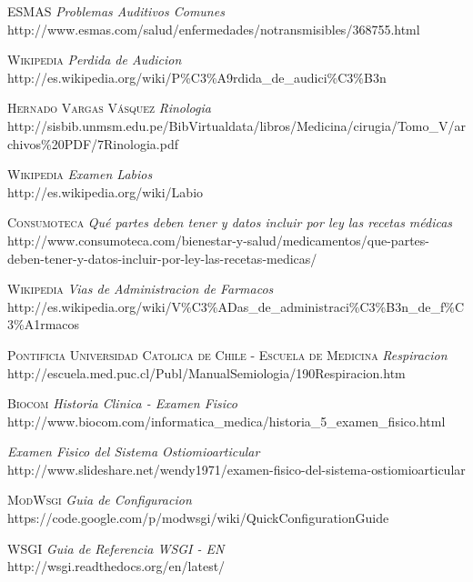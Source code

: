 \begin{thebibliography}{X}
     \textsc{ESMAS} \textit{Problemas Auditivos Comunes}  \\
        http://www.esmas.com/salud/enfermedades/notransmisibles/368755.html
    
     \textsc{Wikipedia} \textit{Perdida de Audicion}  \\
        http://es.wikipedia.org/wiki/P\%C3\%A9rdida\_de\_audici\%C3\%B3n

     \textsc{Hernado Vargas Vásquez} \textit{Rinologia}  \\
        http://sisbib.unmsm.edu.pe/BibVirtualdata/libros/Medicina/cirugia/Tomo\_V/archivos\%20PDF/7Rinologia.pdf
    
     \textsc{Wikipedia} \textit{Examen Labios}   \\
        http://es.wikipedia.org/wiki/Labio

     \textsc{Consumoteca} \textit{Qué partes deben tener y datos incluir por ley las recetas médicas} \\
        http://www.consumoteca.com/bienestar-y-salud/medicamentos/que-partes-deben-tener-y-datos-incluir-por-ley-las-recetas-medicas/

     \textsc{Wikipedia} \textit{Vias de Administracion de Farmacos}  \\
        http://es.wikipedia.org/wiki/V\%C3\%ADas\_de\_administraci\%C3\%B3n\_de\_f\%C3\%A1rmacos
    
     \textsc{Pontificia Universidad Catolica de Chile - Escuela de Medicina} \textit{Respiracion} \\
        http://escuela.med.puc.cl/Publ/ManualSemiologia/190Respiracion.htm

     \textsc{Biocom} \textit{Historia Clinica - Examen Fisico}  \\
        http://www.biocom.com/informatica\_medica/historia\_5\_examen\_fisico.html

     \textit{Examen Fisico del Sistema Ostiomioarticular}  \\
        http://www.slideshare.net/wendy1971/examen-fisico-del-sistema-ostiomioarticular
    
     \textsc{ModWsgi} \textit{Guia de Configuracion}  \\
        https://code.google.com/p/modwsgi/wiki/QuickConfigurationGuide
 
     \textsc{WSGI} \textit{Guia de Referencia WSGI - EN}  \\ 
        http://wsgi.readthedocs.org/en/latest/
    

\end{thebibliography}

